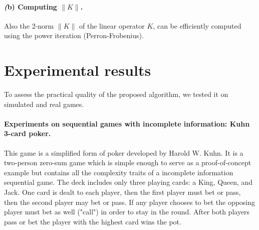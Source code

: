 \documentclass[a4paper,9pt]{extarticle}
\begin{document}

\paragraph*{\textit(b) Computing $\|K\|$.}
Also the 2-norm $\|K\|$ of the linear operator $K$, can be efficiently
computed using the power iteration (Perron-Frobenius).

\section{Experimental results}
\label{sec:results}
To assess the practical quality of the proposed algorithm, we
tested it on simulated and real games.
\paragraph*{Experiments on sequential games with incomplete
  information: Kuhn 3-card
  poker.} This game is a simplified form of poker
developed by Harold W. Kuhn. It is a two-person zero-sum game which is
simple enough to serve as a proof-of-concept example but contains all
the complexity traits of a incomplete information sequential game. The
deck includes only three playing cards: a King, Queen, and
Jack. One card is dealt to each player, then the first player must bet
or pass, then the second player may bet or pass. If any player chooses
to bet the opposing player must bet as well ("call") in order to stay
in the round. After both players pass or bet the player with the
highest card wins the pot.%
\end{document}
